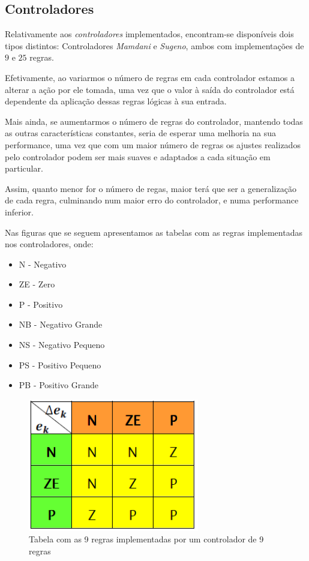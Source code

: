 \documentclass{article}
\begin{document}
\subsection{Controladores}

Relativamente aos \emph{controladores} implementados, encontram-se disponíveis dois tipos distintos: Controladores \emph{Mamdani} e \emph{Sugeno}, ambos com implementações de $9$ e $25$ regras.

Efetivamente, ao variarmos o número de regras em cada controlador estamos a alterar a ação por ele tomada, uma vez que o valor à saída do controlador está dependente da aplicação dessas regras lógicas à sua entrada.

Mais ainda, se aumentarmos o número de regras do controlador, mantendo todas as outras características constantes, seria de esperar uma melhoria na sua performance, uma vez que com um maior número de regras os ajustes realizados pelo controlador podem ser mais suaves e adaptados a cada situação em particular.

Assim, quanto menor for o número de regas, maior terá que ser a generalização de cada regra, culminando num maior erro do controlador, e numa performance inferior.

Nas figuras que se seguem apresentamos as tabelas com as regras implementadas nos controladores, onde:

\begin{itemize}
\item N - Negativo
\item ZE - Zero
\item P - Positivo
\item NB - Negativo Grande
\item NS - Negativo Pequeno
\item PS - Positivo Pequeno
\item PB - Positivo Grande
\end{itemize}


\begin{figure}[H]
  \centering
      \includegraphics[scale=0.5]{Images/9_Rules.png}
  \caption{Tabela com as 9 regras implementadas por um controlador de 9 regras}
\end{figure}
\end{document}

